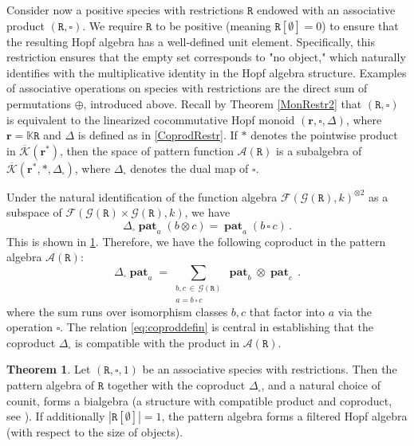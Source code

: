 \documentclass[12pt, reqno]{amsart}
\newcommand{\raul}[1]{\todo[color=green!30,inline]{CH, #1}}
\theoremstyle{definition}
\newtheorem{thm}{Theorem}[section]
\DeclareMathOperator{\pat}{\mathbf{pat}}
\newcommand{\prR}{\mathtt{R}}
\newcommand{\trr}{\mathbf{r}}
\newcommand{\Kc}{\mathcal{K}}
\newcommand{\Kcb}{\overline{\Kc}}
\newcommand{\sq}{{{\scriptstyle{\square}}}}
\begin{document}

Consider now a positive species with restrictions $\prR$ endowed with an associative product $(\prR, \sq)$. We require $\prR$ to be positive (meaning $\prR[\emptyset] = 0$) to ensure that the resulting Hopf algebra has a well-defined unit element. Specifically, this restriction ensures that the empty set corresponds to "no object," which naturally identifies with the multiplicative identity in the Hopf algebra structure. Examples of associative operations on species with restrictions are the direct sum of permutations $\oplus$, introduced above. Recall by Theorem \eqref{MonRestr2} that 
$(\prR, \sq)$ is equivalent to the linearized cocommutative Hopf monoid $(\trr, \sq, \Delta)$, where $\trr=\mathbb{K}\prR$ and $\Delta$ is defined as in \eqref{CoprodRestr}. If $*$ denotes the pointwise product in $\Kcb(\trr^*)$, then the space of pattern function $\mathcal{A}(\prR)$ is a subalgebra of $\Kcb(\trr^*, *, \Delta_{\sq})$, where $\Delta_{\sq}$ denotes the dual map of $\sq$.


Under the natural identification of the function algebra $\mathcal{F}(\mathcal G (\prR), k)^{\otimes 2}$ as a subspace of $\mathcal{F}(\mathcal G (\prR) \times \mathcal G (\prR), k)$, we have
\begin{equation}\label{eq:coproddefin}
 \Delta_{\sq} \pat_a (b \otimes  c) =  \pat_a (b \,\sq\, c) \, .
\end{equation}
This is shown in \cref{thm:conHopfalgebra}. Therefore, we have the following coproduct in the pattern algebra $\mathcal A (\prR)$:
\begin{equation}\label{eq:coprodformula}
\Delta_{\sq} \pat_ a = \sum_{\substack{ b, c \, \in \, \mathcal G (\prR) \\ a = b \, \sq \, c}} \pat_b \otimes \pat_c \, .
\end{equation}
where the sum runs over isomorphism classes $b, c$ that factor into $a$ via the operation $\sq$. 
The relation \eqref{eq:coproddefin} is central in establishing that the coproduct $\Delta_{\sq} $ is compatible with the product in $\mathcal A (\prR)$.


\begin{thm}\label{thm:conHopfalgebra}
Let $(\prR, \sq, 1) $ be an associative species with restrictions.
Then the pattern algebra of $\prR$ together with the coproduct $\Delta_{\sq}$, and a natural choice of counit, forms a bialgebra (a structure with compatible product and coproduct, see \cite{AM2010}).
If additionally $| \prR[\emptyset ] | = 1 $, the pattern algebra forms a filtered Hopf algebra (with respect to the size of objects).
\end{thm}
\end{document}
